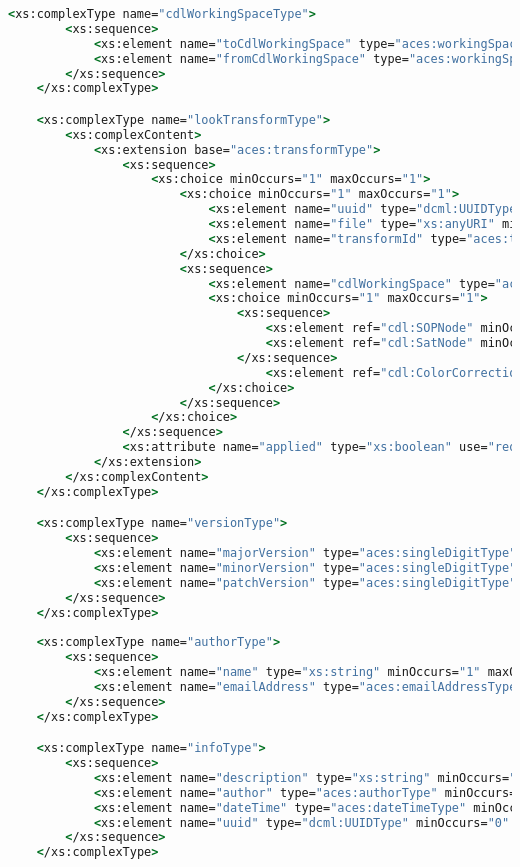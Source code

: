 \begin{lstlisting}[language=csh]
	<xs:complexType name="cdlWorkingSpaceType">
		<xs:sequence>
			<xs:element name="toCdlWorkingSpace" type="aces:workingSpaceTransformType" minOccurs="0" maxOccurs="1"/>
			<xs:element name="fromCdlWorkingSpace" type="aces:workingSpaceTransformType" minOccurs="1" maxOccurs="1"/>
		</xs:sequence>
	</xs:complexType>

	<xs:complexType name="lookTransformType">
		<xs:complexContent>
			<xs:extension base="aces:transformType">
				<xs:sequence>
					<xs:choice minOccurs="1" maxOccurs="1">
						<xs:choice minOccurs="1" maxOccurs="1">
							<xs:element name="uuid" type="dcml:UUIDType" minOccurs="1" maxOccurs="1"/>
							<xs:element name="file" type="xs:anyURI" minOccurs="1" maxOccurs="1"/>
							<xs:element name="transformId" type="aces:tnLookTransform" minOccurs="1" maxOccurs="1"/>
						</xs:choice>
						<xs:sequence>
							<xs:element name="cdlWorkingSpace" type="aces:cdlWorkingSpaceType" minOccurs="1" maxOccurs="1"/>
							<xs:choice minOccurs="1" maxOccurs="1">
								<xs:sequence>
									<xs:element ref="cdl:SOPNode" minOccurs="1" maxOccurs="1"/>
									<xs:element ref="cdl:SatNode" minOccurs="1" maxOccurs="1"/>
								</xs:sequence>
									<xs:element ref="cdl:ColorCorrectionRef"/>
							</xs:choice>
						</xs:sequence>
					</xs:choice>
				</xs:sequence>
				<xs:attribute name="applied" type="xs:boolean" use="required"/>
			</xs:extension>
		</xs:complexContent>
	</xs:complexType>

	<xs:complexType name="versionType">
		<xs:sequence>
			<xs:element name="majorVersion" type="aces:singleDigitType" minOccurs="1" maxOccurs="1"/>
			<xs:element name="minorVersion" type="aces:singleDigitType" minOccurs="1" maxOccurs="1"/>
			<xs:element name="patchVersion" type="aces:singleDigitType" minOccurs="1" maxOccurs="1"/>
		</xs:sequence>
	</xs:complexType>
	
	<xs:complexType name="authorType">
		<xs:sequence>
			<xs:element name="name" type="xs:string" minOccurs="1" maxOccurs="1"/>
			<xs:element name="emailAddress" type="aces:emailAddressType" minOccurs="1" maxOccurs="1"/>
		</xs:sequence>
	</xs:complexType>

	<xs:complexType name="infoType">
		<xs:sequence>
			<xs:element name="description" type="xs:string" minOccurs="0" maxOccurs="1"/>
			<xs:element name="author" type="aces:authorType" minOccurs="0" maxOccurs="unbounded"/>
			<xs:element name="dateTime" type="aces:dateTimeType" minOccurs="1" maxOccurs="1"/>
			<xs:element name="uuid" type="dcml:UUIDType" minOccurs="0" maxOccurs="1"/>
		</xs:sequence>
	</xs:complexType>


\end{lstlisting}
